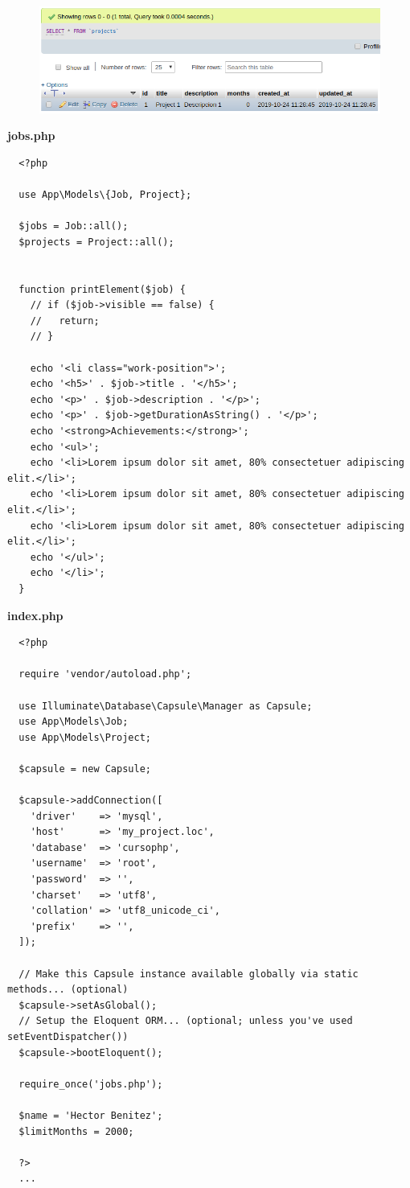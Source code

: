 \documentclass{article}
\begin{document}
\begin{figure}[h!]
  \centering
  \includegraphics[scale=0.5]{./Pictures/096_bd_funcional.png}
\end{figure}

\textbf{jobs.php}
\begin{verbatim}
  <?php

  use App\Models\{Job, Project};

  $jobs = Job::all();
  $projects = Project::all();


  function printElement($job) {
    // if ($job->visible == false) {
    //   return;
    // }

    echo '<li class="work-position">';
    echo '<h5>' . $job->title . '</h5>';
    echo '<p>' . $job->description . '</p>';
    echo '<p>' . $job->getDurationAsString() . '</p>';
    echo '<strong>Achievements:</strong>';
    echo '<ul>';
    echo '<li>Lorem ipsum dolor sit amet, 80% consectetuer adipiscing elit.</li>';
    echo '<li>Lorem ipsum dolor sit amet, 80% consectetuer adipiscing elit.</li>';
    echo '<li>Lorem ipsum dolor sit amet, 80% consectetuer adipiscing elit.</li>';
    echo '</ul>';
    echo '</li>';
  }
\end{verbatim}

\textbf{index.php}
\begin{verbatim}
  <?php

  require 'vendor/autoload.php';

  use Illuminate\Database\Capsule\Manager as Capsule;
  use App\Models\Job;
  use App\Models\Project;

  $capsule = new Capsule;

  $capsule->addConnection([
    'driver'    => 'mysql',
    'host'      => 'my_project.loc',
    'database'  => 'cursophp',
    'username'  => 'root',
    'password'  => '',
    'charset'   => 'utf8',
    'collation' => 'utf8_unicode_ci',
    'prefix'    => '',
  ]);

  // Make this Capsule instance available globally via static methods... (optional)
  $capsule->setAsGlobal();
  // Setup the Eloquent ORM... (optional; unless you've used setEventDispatcher())
  $capsule->bootEloquent();

  require_once('jobs.php');

  $name = 'Hector Benitez';
  $limitMonths = 2000;

  ?>
  ...
\end{verbatim}
\end{document}

